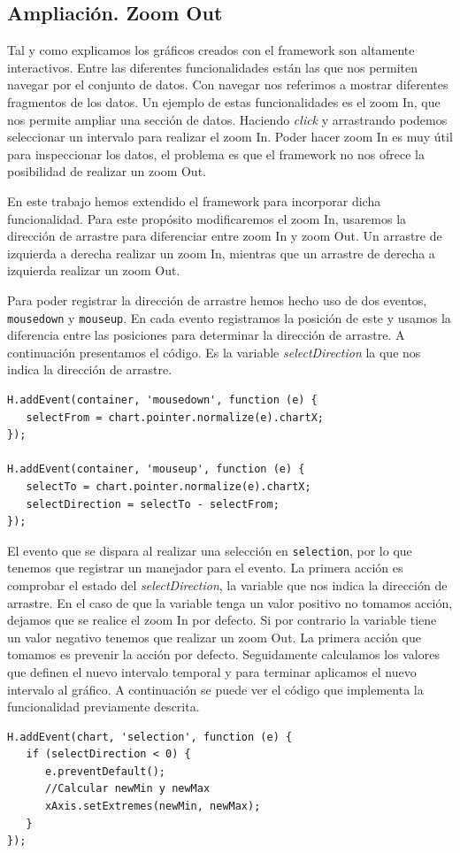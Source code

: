 	\subsection{Ampliación. Zoom Out}
		Tal y como explicamos los gráficos creados con el framework son altamente interactivos. Entre las diferentes funcionalidades están las
		que nos permiten navegar por el conjunto de datos. Con navegar nos referimos a mostrar diferentes fragmentos de los datos. Un ejemplo
		de estas funcionalidades es el zoom In, que nos permite ampliar una sección de datos. Haciendo \emph{click} y arrastrando podemos
		seleccionar un intervalo para realizar el zoom In. Poder hacer zoom In es muy útil para inspeccionar los datos, el problema es que el
		framework no nos ofrece la posibilidad de realizar un zoom Out.
		\par
		En este trabajo hemos extendido el framework para incorporar dicha funcionalidad. Para este propósito modificaremos el zoom In,
		usaremos la dirección de arrastre para diferenciar entre zoom In y zoom Out. Un arrastre de izquierda a derecha realizar un zoom In,
		mientras que un arrastre de derecha a izquierda realizar un zoom Out. 
		\par
		Para poder registrar la dirección de arrastre hemos hecho uso de dos eventos, \texttt{mousedown} y \texttt{mouseup}. En cada evento
		registramos la posición de este y usamos la diferencia entre las posiciones para determinar la dirección de arrastre. A continuación
		presentamos el código. Es la variable \emph{selectDirection} la que nos indica la dirección de arrastre.
		\begin{lstlisting}
H.addEvent(container, 'mousedown', function (e) {
   selectFrom = chart.pointer.normalize(e).chartX;
});

H.addEvent(container, 'mouseup', function (e) {
   selectTo = chart.pointer.normalize(e).chartX;
   selectDirection = selectTo - selectFrom;													            
});
		\end{lstlisting}
		\par
		El evento que se dispara al realizar una selección en \texttt{selection}, por lo que tenemos que registrar un manejador para el
		evento. La primera acción es comprobar el estado del \emph{selectDirection}, la variable que nos indica la dirección de arrastre. En
		el caso de que la variable tenga un valor positivo no tomamos acción, dejamos que se realice el zoom In por defecto. Si por contrario
		la variable tiene un valor negativo tenemos que realizar un zoom Out. La primera acción que tomamos es prevenir la acción por defecto.
		Seguidamente calculamos los valores que definen el nuevo intervalo temporal y para terminar aplicamos el nuevo intervalo al gráfico. A
		continuación se puede ver el código que implementa la funcionalidad previamente descrita.
		\begin{lstlisting}
H.addEvent(chart, 'selection', function (e) {
   if (selectDirection < 0) {
      e.preventDefault();
      //Calcular newMin y newMax
      xAxis.setExtremes(newMin, newMax);
   }
});
		\end{lstlisting}

		





